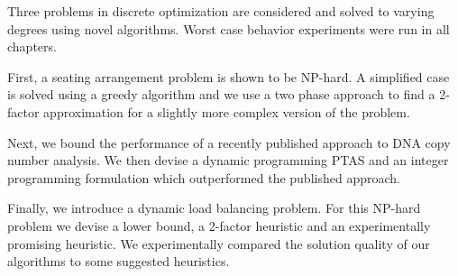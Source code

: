 Three problems in discrete optimization are considered and solved to varying degrees using novel algorithms. Worst case behavior experiments were run in all chapters.

First, a seating arrangement problem is shown to be NP-hard. A simplified case is solved using a greedy algorithm and we use a two phase approach to find a 2-factor approximation for a slightly more complex version of the problem.

Next, we bound the performance of a recently published approach to DNA copy number analysis.  We then devise a dynamic programming PTAS and an integer programming formulation which outperformed the published approach.

Finally, we introduce a dynamic load balancing problem. For this NP-hard problem we devise a lower bound, a 2-factor heuristic and an experimentally promising heuristic. We experimentally compared the solution quality of our algorithms to some suggested heuristics.
